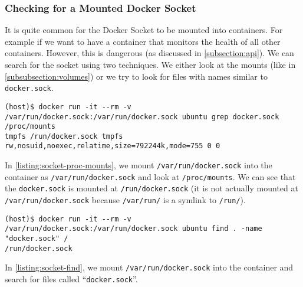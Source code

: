 \subsubsection{Checking for a Mounted Docker Socket}\label{subsubsection:searching-socket}
It is quite common for the Docker Socket to be mounted into containers. For example if we want to have a container that monitors the health of all other containers. However, this is dangerous (as discussed in \autoref{subsection:api}). We can search for the socket using two techniques. We either look at the mounts (like in \autoref{subsubsection:volumes}) or we try to look for files with names similar to \lstinline{docker.sock}.

\begin{lstlisting}[caption={\lstinline{docker.sock} in \lstinline{/proc/mounts}.},captionpos=b,label={listing:socket-proc-mounts}]
(host)$ docker run -it --rm -v /var/run/docker.sock:/var/run/docker.sock ubuntu grep docker.sock /proc/mounts
tmpfs /run/docker.sock tmpfs rw,nosuid,noexec,relatime,size=792244k,mode=755 0 0
\end{lstlisting}

In \autoref{listing:socket-proc-mounts}, we mount \lstinline{/var/run/docker.sock} into the container as \lstinline{/var/run/docker.sock} and look at \lstinline{/proc/mounts}. We can see that the \lstinline{docker.sock} is mounted at \lstinline{/run/docker.sock} (it is not actually mounted at \lstinline{/var/run/docker.sock} because \lstinline{/var/run/} is a symlink to \lstinline{/run/}).

\medskip

\begin{lstlisting}[caption={Running \lstinline{find} to search for \lstinline{docker.sock}.},captionpos=b, label={listing:socket-find}]
(host)$ docker run -it --rm -v /var/run/docker.sock:/var/run/docker.sock ubuntu find . -name "docker.sock" /
/run/docker.sock
\end{lstlisting}

In \autoref{listing:socket-find}, we mount \lstinline{/var/run/docker.sock} into the container and search for files called ``\lstinline{docker.sock}''.
